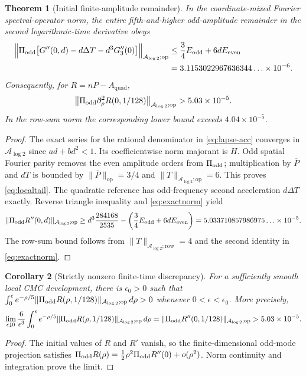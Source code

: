 \documentclass[11pt,a4paper]{article}
\newtheorem{theorem}{Theorem}[section]
\newtheorem{corollary}[theorem]{Corollary}
\theoremstyle{remark}
\newcommand{\A}{\mathcal A_{\log 2}}
\newcommand{\pbar}{\overline P}
\newcommand{\op}{\mathrm{op}}
\newcommand{\row}{\mathrm{row}}
\begin{document}
\begin{theorem}[Initial finite-amplitude remainder]\label{thm:local}
In the coordinate-mixed Fourier spectral-operator norm, the entire fifth-and-higher odd-amplitude remainder in the second logarithmic-time derivative obeys
\begin{align}\label{eq:localtail}
\Big\|\Pi_{\rm odd}\bigl[G''(0,d)-d\Delta T-d^3G_3''(0)\bigr]\Big\|_{\A;\op}
&\leq\frac34E_{\mathrm{odd}}+6dE_{\mathrm{even}}\\
&=3.1153022967636344\ldots\times10^{-6}.\nonumber
\end{align}
Consequently, for $R=nP-A_{\mathrm{quad}}$,
\begin{equation}\label{eq:nonzero}
\big\|\Pi_{\rm odd}\partial_\rho^2R(0,1/128)\big\|_{\A;\op}
>5.03\times10^{-5}.
\end{equation}
In the row-sum norm the corresponding lower bound exceeds $4.04\times10^{-5}$.
\end{theorem}
\begin{proof}
The exact series for the rational denominator in \eqref{eq:lapse-acc} converges in $\A$ since $ad+bd^2<1$. Its coefficientwise norm majorant is $H$. Odd spatial Fourier parity removes the even amplitude orders from $\Pi_{\rm odd}$; multiplication by $\pbar$ and $dT$ is bounded by $\|\pbar\|_{\op}=3/4$ and $\|T\|_{\A;\op}=6$. This proves \eqref{eq:localtail}. The quadratic reference has odd-frequency second acceleration $d\Delta T$ exactly. Reverse triangle inequality and \eqref{eq:exactnorm} yield
\[
\|\Pi_{\rm odd}R''(0,d)\|_{\A;\op}
\geq d^3\frac{284168}{2535}-\left(\frac34E_{\mathrm{odd}}+6dE_{\mathrm{even}}\right)
=5.033710857986975\ldots\times10^{-5}.
\]
The row-sum bound follows from $\|T\|_{\A;\row}=4$ and the second identity in \eqref{eq:exactnorm}.
\end{proof}

\begin{corollary}[Strictly nonzero finite-time discrepancy]\label{cor:positive}
For a sufficiently smooth local CMC development, there is $\epsilon_0>0$ such that $\int_0^\epsilon e^{-\rho/5}\|\Pi_{\rm odd}R(\rho,1/128)\|_{\A;\op}\,d\rho>0$ whenever $0<\epsilon<\epsilon_0$. More precisely,
\begin{equation}\label{eq:smalltime}
\lim_{\epsilon\downarrow0}\frac6{\epsilon^3}
\int_0^\epsilon e^{-\rho/5}\|\Pi_{\rm odd}R(\rho,1/128)\|_{\A;\op}\,d\rho
=\|\Pi_{\rm odd}R''(0,1/128)\|_{\A;\op}>5.03\times10^{-5}.
\end{equation}
\end{corollary}
\begin{proof}
The initial values of $R$ and $R'$ vanish, so the finite-dimensional odd-mode projection satisfies $\Pi_{\rm odd}R(\rho)=\tfrac12\rho^2\Pi_{\rm odd}R''(0)+o(\rho^2)$. Norm continuity and integration prove the limit.
\end{proof}
\end{document}
